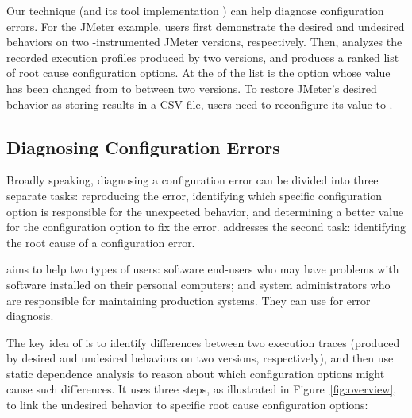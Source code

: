 
Our technique (and its tool implementation \ourtool) can help
diagnose configuration errors. For the JMeter example,
users first demonstrate the desired and undesired
behaviors on two \ourtool-instrumented
JMeter versions, respectively. Then, \ourtool analyzes the
recorded execution profiles produced by two versions, and produces
a ranked list of root cause configuration options. At the
 of the list is the
 option whose 
value has been changed from  to 
between two versions. To restore JMeter's desired
behavior as storing results in a CSV file, users
need to reconfigure its value to .

\subsection{Diagnosing Configuration Errors}

Broadly speaking, diagnosing a configuration
error can be divided into three separate tasks:
reproducing the error, identifying which specific
configuration option is responsible for the unexpected
behavior, and determining a better value for the
configuration option to fix the error. \ourtool addresses
the second task: identifying the root cause of
a configuration error.

\ourtool aims to help two types of users: software end-users
who may have problems with software installed on their
personal computers; and system administrators who are
responsible for maintaining production systems.
They can use \ourtool for error diagnosis.


The key idea of \ourtool is to identify differences between
two execution traces (produced by desired and
undesired behaviors on two versions, respectively),
and then use static dependence analysis to reason
about which configuration options
might cause such differences. It uses
three steps, as illustrated in Figure~\ref{fig:overview},  to link the undesired
behavior to specific root cause configuration options:

